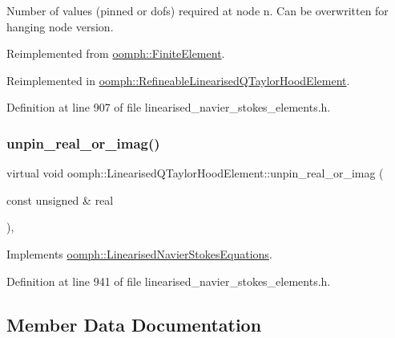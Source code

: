 Number of values (pinned or dofs) required at node n. Can be overwritten for hanging node version. 



Reimplemented from \hyperlink{classoomph_1_1FiniteElement_a56610c60d5bc2d7c27407a1455471b1a}{oomph\+::\+Finite\+Element}.



Reimplemented in \hyperlink{classoomph_1_1RefineableLinearisedQTaylorHoodElement_a16716cc6af73490d9e2577dd090ac587}{oomph\+::\+Refineable\+Linearised\+Q\+Taylor\+Hood\+Element}.



Definition at line 907 of file linearised\+\_\+navier\+\_\+stokes\+\_\+elements.\+h.

\mbox{\label{classoomph_1_1LinearisedQTaylorHoodElement_aed1b1549f18cc58931bf86b67ac9e6a2}} 
\subsubsection{\texorpdfstring{unpin\+\_\+real\+\_\+or\+\_\+imag()}{unpin\_real\_or\_imag()}}
{\footnotesize\ttfamily virtual void oomph\+::\+Linearised\+Q\+Taylor\+Hood\+Element\+::unpin\+\_\+real\+\_\+or\+\_\+imag (\begin{DoxyParamCaption}\item[{const unsigned \&}]{real }\end{DoxyParamCaption})\hspace{0.3cm}{\ttfamily [inline]}, {\ttfamily [virtual]}}



Implements \hyperlink{classoomph_1_1LinearisedNavierStokesEquations_ae23ea66f0fd2679658946f790bd53ccd}{oomph\+::\+Linearised\+Navier\+Stokes\+Equations}.



Definition at line 941 of file linearised\+\_\+navier\+\_\+stokes\+\_\+elements.\+h.



\subsection{Member Data Documentation}
\mbox{\label{classoomph_1_1LinearisedQTaylorHoodElement_a0b73e05a76c322bbe36d50084c9741da}} 
